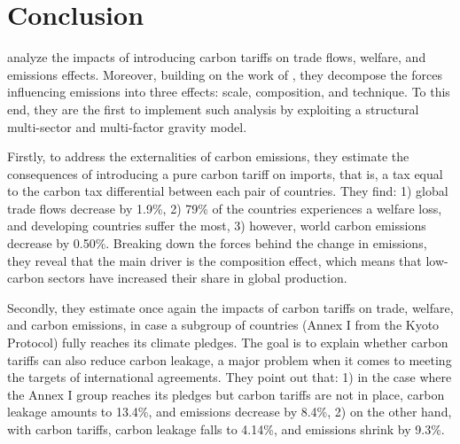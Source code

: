 \chapter{Conclusion}
\label{sec:conclusion}

\textcite{Larch2017} analyze the impacts of introducing carbon tariffs on trade flows, welfare, and emissions effects. Moreover, building on the work of \textcite{copeland2005}, they decompose the forces influencing emissions into three effects: scale, composition, and technique. To this end, they are the first to implement such analysis by exploiting a structural multi-sector and multi-factor gravity model.

Firstly, to address the externalities of carbon emissions, they estimate the consequences of introducing a pure carbon tariff on imports, that is, a tax equal to the carbon tax differential between each pair of countries. They find: 1) global trade flows decrease by 1.9\%, 2) 79\% of the countries experiences a welfare loss, and developing countries suffer the most, 3) however, world carbon emissions decrease by 0.50\%. Breaking down the forces behind the change in emissions, they reveal that the main driver is the composition effect, which means that low-carbon sectors have increased their share in global production.

Secondly, they estimate once again the impacts of carbon tariffs on trade, welfare, and carbon emissions, in case a subgroup of countries (Annex I from the Kyoto Protocol) fully reaches its climate pledges. The goal is to explain whether carbon tariffs can also reduce carbon leakage, a major problem when it comes to meeting the targets of international agreements. They point out that: 1) in the case where the Annex I group reaches its pledges but carbon tariffs are not in place, carbon leakage amounts to 13.4\%, and emissions decrease by 8.4\%, 2) on the other hand, with carbon tariffs, carbon leakage falls to 4.14\%, and emissions shrink by 9.3\%.
